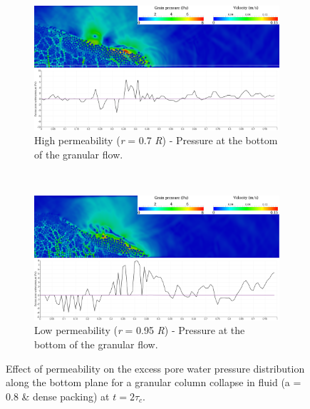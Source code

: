 \documentclass[12pt,a4paper,twocolumn,fleqn]{narms}
\begin{document}
\begin{figure}
\centering
\begin{subfigure}[t]{0.975\linewidth}
	\centering
    \includegraphics[width=\linewidth]{figs/a08/r07_PWP_flow_dense}
    \caption{High permeability (\textit{r} = 0.7 \textit{R}) - Pressure at the 
    bottom of the granular flow.}
    \label{fig:r07_PWP_flow_dense}
\end{subfigure}
\\
\begin{subfigure}[t]{0.975\linewidth}
	\centering
    \includegraphics[width=\linewidth]{figs/a08/r095_PWP_flow_dense}
    \caption{Low permeability (\textit{r} = 0.95 \textit{R}) - Pressure at the 
        bottom of the granular flow.}
    \label{fig:r095_PWP_flow_dense}
\end{subfigure}
\caption{Effect of permeability on the excess pore water pressure distribution 
along the bottom plane for a granular column collapse in fluid (a = 0.8 \& 
dense packing) at $t = 2\tau_c$.}
\label{fig:PWP_flow_dense}
\end{figure}
\end{document}
